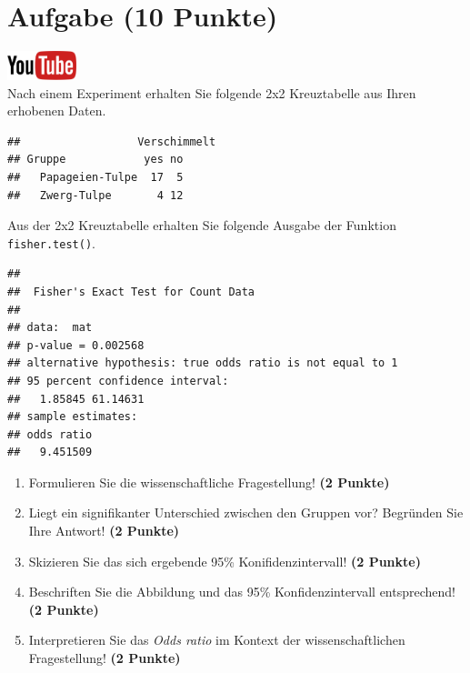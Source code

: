 \documentclass[a4paper, 9pt]{scrartcl}\usepackage[]{graphicx}\usepackage[]{xcolor}
\makeatletter
\newenvironment{kframe}{%
 \def\at@end@of@kframe{}%
 \ifinner\ifhmode%
  \def\at@end@of@kframe{\end{minipage}}%
  \begin{minipage}{\columnwidth}%
 \fi\fi%
 \def\FrameCommand##1{\hskip\@totalleftmargin \hskip-\fboxsep
 \colorbox{shadecolor}{##1}\hskip-\fboxsep
     \hskip-\linewidth \hskip-\@totalleftmargin \hskip\columnwidth}%
 \MakeFramed {\advance\hsize-\width
   \@totalleftmargin\z@ \linewidth\hsize
   \@setminipage}}%
 {\par\unskip\endMakeFramed%
 \at@end@of@kframe}
\newenvironment{knitrout}{}{} %
\makeatother
\begin{document}
\section{Aufgabe \hfill (10 Punkte)}

\hfill\href{https://youtu.be/ghArbetOr_E}{\includegraphics[width =
  2cm]{img/youtube}}\\[1Ex]

Nach einem Experiment erhalten Sie folgende 2x2 Kreuztabelle aus Ihren
erhobenen Daten.

\begin{knitrout}
\color{fgcolor}\begin{kframe}
\begin{verbatim}
##                  Verschimmelt
## Gruppe            yes no
##   Papageien-Tulpe  17  5
##   Zwerg-Tulpe       4 12
\end{verbatim}
\end{kframe}
\end{knitrout}

Aus der 2x2 Kreuztabelle erhalten Sie folgende \Rlogo Ausgabe der Funktion
\texttt{fisher.test()}.

\begin{knitrout}
\color{fgcolor}\begin{kframe}
\begin{verbatim}
## 
## 	Fisher's Exact Test for Count Data
## 
## data:  mat
## p-value = 0.002568
## alternative hypothesis: true odds ratio is not equal to 1
## 95 percent confidence interval:
##   1.85845 61.14631
## sample estimates:
## odds ratio 
##   9.451509
\end{verbatim}
\end{kframe}
\end{knitrout}


\begin{enumerate}
\item Formulieren Sie die wissenschaftliche Fragestellung! \textbf{(2 Punkte)}
\item Liegt ein signifikanter Unterschied zwischen den Gruppen vor?
  Begr{\"u}nden Sie Ihre Antwort! \textbf{(2 Punkte)}
\item Skizieren Sie das sich ergebende 95\% Konifidenzintervall! \textbf{(2 Punkte)}
\item Beschriften Sie die Abbildung und
  das 95\% Konfidenzintervall entsprechend! \textbf{(2 Punkte)} 
\item Interpretieren Sie das \textit{Odds ratio} im Kontext der
  wissenschaftlichen Fragestellung! \textbf{(2 Punkte)} 
\end{enumerate}
 
\end{document}
